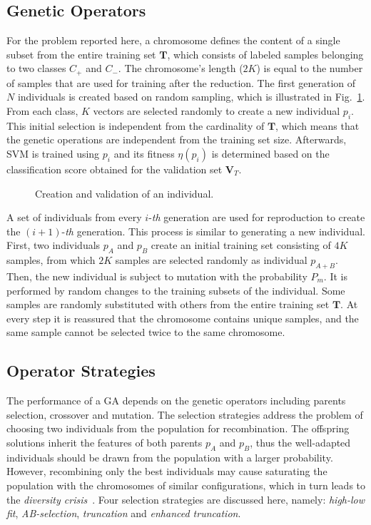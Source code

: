 \documentclass{llncs}
\begin{document}
\subsection{Genetic Operators}\label{sec:ga_process}

For the problem reported here, a chromosome defines the content of a
single subset from the entire training set $\bm{T}$, which consists
of labeled samples belonging to two classes $C_{+}$ and $C_{-}$. The
chromosome's length ($2K$) is equal to the number of samples that
are used for training after the reduction. The first generation of
$N$ individuals is created based on random sampling, which is
illustrated in Fig.~\ref{fig:individual}. From each class, $K$
vectors are selected randomly to create a new individual $p_i$. This initial selection is independent from the cardinality of $\bm{T}$, which means that the genetic operations are independent from the training set size.
Afterwards, SVM is trained using $p_i$ and its fitness $\eta(p_i)$
is determined based on the classification score obtained for the
validation set $\bm{V}_T$.
\begin{figure}[t]
\centering


  \caption
  {
    Creation and validation of an individual.
  }
  \label{fig:individual}
\end{figure}

A set of individuals from every $i$-\textit{th} generation are used
for reproduction to create the $(i+1)$-\textit{th} generation. This
process is similar to generating a new individual. First, two
individuals $p_{A}$ and $p_{B}$ create an initial training set
consisting of $4K$ samples, from which $2K$ samples are selected
randomly as individual $p_{A+B}$. Then, the new individual is
subject to mutation with the probability $P_m$. It is performed by
random changes to the training subsets of the individual. Some
samples are randomly substituted with others from the entire
training set $\bm{T}$. At every step it is reassured that the
chromosome contains unique samples, and the same sample cannot be
selected twice to the same chromosome.

\subsection{Operator Strategies} \label{sec:ga_strat}

The performance of a GA depends on the genetic operators including
parents selection, crossover and mutation. The selection strategies
address the problem of choosing two individuals from the population
for recombination. The offspring solutions inherit the features of
both parents $p_{A}$ and $p_{B}$, thus the well-adapted individuals
should be drawn from the population with a larger probability.
However, recombining only the best individuals may cause saturating
the population with the chromosomes of similar configurations, which
in turn leads to the \emph{diversity crisis}~\cite{Corne1999}. Four selection strategies are discussed here, namely: \emph{high-low fit}, \emph{AB-selection}, \emph{truncation} and \emph{enhanced truncation}.
\end{document}
